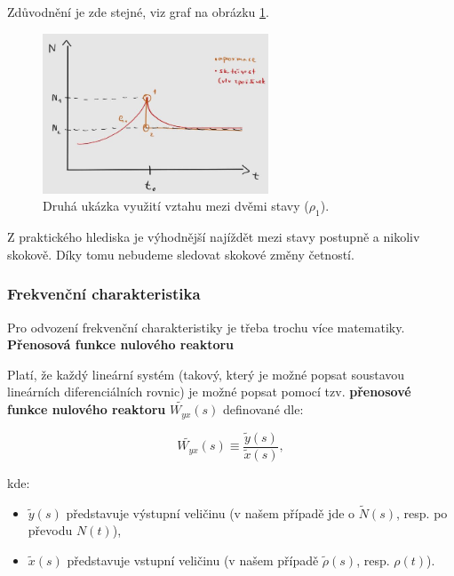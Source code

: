 Zdůvodnění je zde stejné, viz graf na obrázku \ref{fig_podil_N_2}.

\begin{figure}[H]
 \centering
 \includegraphics[width=0.6\textwidth]{img/podil_N_2.jpg}
 \caption{Druhá ukázka využití vztahu mezi dvěmi stavy ($\rho_1$).}
 \label{fig_podil_N_2}
\end{figure}

Z praktického hlediska je výhodnější najíždět mezi stavy postupně a nikoliv skokově. Díky tomu nebudeme sledovat skokové změny četností.

\normalsize

\subsubsection{Frekvenční charakteristika}

Pro odvození frekvenční charakteristiky je třeba trochu více matematiky.\\

\textbf{Přenosová funkce nulového reaktoru}

Platí, že každý lineární systém (takový, který je možné popsat soustavou lineárních diferenciálních rovnic) je možné popsat pomocí tzv. \textbf{přenosové funkce nulového reaktoru} $\tilde{W_{yx}}(s)$ definované dle:

\begin{equation}
  \boxed{
  \tilde{W_{yx}}(s) \equiv \dfrac{\tilde{y}(s)}{\tilde{x}(s)},
  \label{prenosova_funkce_definice}}
\end{equation}

kde:

\begin{itemize}
  \item $\tilde{y}(s)$ představuje výstupní veličinu (v našem případě jde o $\tilde{N}(s)$, resp. po převodu $N(t)$),
  \item $\tilde{x}(s)$ představuje vstupní veličinu (v našem případě $\tilde{\rho}(s)$, resp. $\rho(t)$).
\end{itemize}

